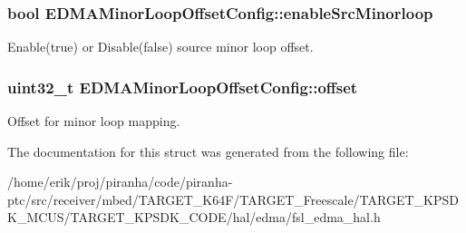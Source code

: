 \subsubsection[{\texorpdfstring{enable\+Src\+Minorloop}{enableSrcMinorloop}}]{\setlength{\rightskip}{0pt plus 5cm}bool E\+D\+M\+A\+Minor\+Loop\+Offset\+Config\+::enable\+Src\+Minorloop}\hypertarget{structEDMAMinorLoopOffsetConfig_a872697ec8728395db0285c382b48a347}{}\label{structEDMAMinorLoopOffsetConfig_a872697ec8728395db0285c382b48a347}
Enable(true) or Disable(false) source minor loop offset. 
\subsubsection[{\texorpdfstring{offset}{offset}}]{\setlength{\rightskip}{0pt plus 5cm}uint32\+\_\+t E\+D\+M\+A\+Minor\+Loop\+Offset\+Config\+::offset}\hypertarget{structEDMAMinorLoopOffsetConfig_acfc1751f75d04d7e484d65589a3d4197}{}\label{structEDMAMinorLoopOffsetConfig_acfc1751f75d04d7e484d65589a3d4197}
Offset for minor loop mapping. 

The documentation for this struct was generated from the following file\+:\begin{DoxyCompactItemize}
\item 
/home/erik/proj/piranha/code/piranha-\/ptc/src/receiver/mbed/\+T\+A\+R\+G\+E\+T\+\_\+\+K64\+F/\+T\+A\+R\+G\+E\+T\+\_\+\+Freescale/\+T\+A\+R\+G\+E\+T\+\_\+\+K\+P\+S\+D\+K\+\_\+\+M\+C\+U\+S/\+T\+A\+R\+G\+E\+T\+\_\+\+K\+P\+S\+D\+K\+\_\+\+C\+O\+D\+E/hal/edma/fsl\+\_\+edma\+\_\+hal.\+h\end{DoxyCompactItemize}

